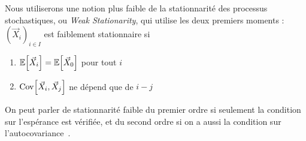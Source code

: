 Nous utiliserons une notion plus faible de la stationnarité des processus stochastiques, ou \emph{Weak Stationarity}, qui utilise les deux premiers moments : $(\vec{X}_i)_{i\in I}$ est faiblement stationnaire si
\begin{enumerate}
	\item $\operatorname{\mathbb{E}}\!\left[\vec{X}_i\right] = \operatorname{\mathbb{E}}\!\left[\vec{X}_0\right]$ pour tout $i$
	\item $\operatorname{Cov}\!\left[\vec{X}_i,\vec{X}_j\right]$ ne dépend que de $i-j$
\end{enumerate}
On peut parler de stationnarité faible du premier ordre si seulement la condition sur l'espérance est vérifiée, et du second ordre si on a aussi la condition sur l'autocovariance~\cite{zhang2014test}.













